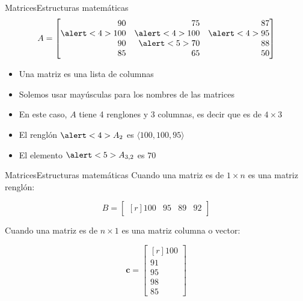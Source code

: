 \documentclass[spanish, c]{beamer}
\begin{document}
\begin{frame}{Matrices}{Estructuras matemáticas}
    $$A = 
    \begin{bmatrix*}[r]
        90 & 75 & 87 \\
        \alert<4>{100} & \alert<4>{100} & \alert<4>{95} \\
        90 & \alert<5>{70} & 88 \\
        85 & 65 & 50
    \end{bmatrix*}
    $$

    \bigskip

    \begin{itemize}[<+->]
        \item Una \alert{matriz} es una lista de columnas\
        \item Solemos usar mayúsculas para los nombres de las matrices
        \item En este caso, $A$ tiene 4 renglones y 3 columnas, es decir que es de $4 \times 3$
        \item El renglón $\alert<4>{A_2}$ es $\langle 100, 100, 95 \rangle$
        \item El elemento $\alert<5>{A_{3,2}}$ es $70$
    \end{itemize}

\end{frame}

\begin{frame}{Matrices}{Estructuras matemáticas}
    Cuando una matriz es de $1 \times n$ es una matriz \alert{renglón}:

    $$B = \begin{bmatrix*}[r] 100 & 95 & 89 & 92 \end{bmatrix*}$$ \pause

    Cuando una matriz es de $n \times 1$ es una matriz \alert{columna} o \alert{vector}:

    $$\mathbf{c} =
    \begin{bmatrix*}[r]
        100 \\ 91 \\ 95 \\ 98 \\ 85
    \end{bmatrix*}$$

\end{frame}
\end{document}
